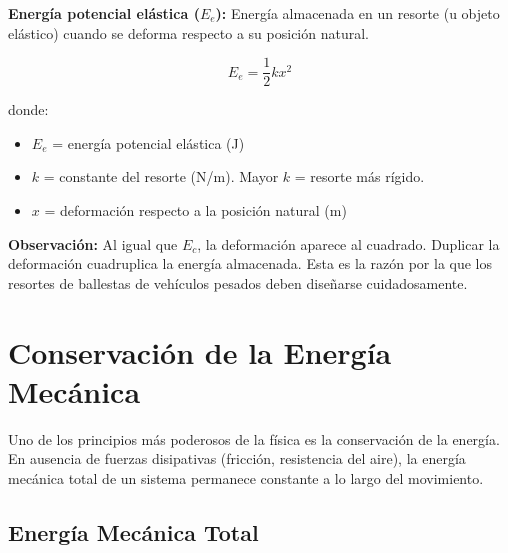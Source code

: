 \begin{seccion}
\begin{definicion}
    \textbf{Energía potencial elástica ($E_e$):} Energía almacenada en un resorte (u objeto elástico) cuando se deforma respecto a su posición natural.
\end{definicion}

\begin{ecuacion}
$$E_e = \frac{1}{2}kx^2$$

donde:
\begin{itemize}
    \item $E_e$ = energía potencial elástica (J)
    \item $k$ = constante del resorte (N/m). Mayor $k$ = resorte más rígido.
    \item $x$ = deformación respecto a la posición natural (m)
\end{itemize}
\end{ecuacion}

\textbf{Observación:} Al igual que $E_c$, la deformación aparece al cuadrado. Duplicar la deformación cuadruplica la energía almacenada. Esta es la razón por la que los resortes de ballestas de vehículos pesados deben diseñarse cuidadosamente.
\end{seccion}

\newpage

\section{Conservación de la Energía Mecánica}

\begin{seccion}
Uno de los principios más poderosos de la física es la conservación de la energía. En ausencia de fuerzas disipativas (fricción, resistencia del aire), la energía mecánica total de un sistema permanece constante a lo largo del movimiento.
\end{seccion}

\subsection{Energía Mecánica Total}

